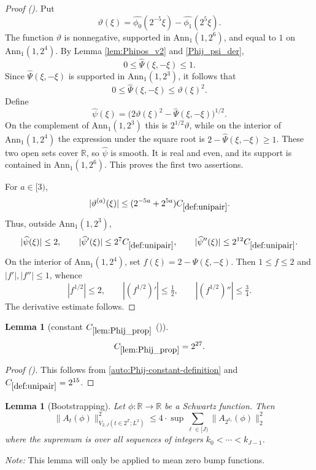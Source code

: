 \documentclass[12pt,reqno]{amsart}
\newcommand{\auto}{{({\tiny\faCar})}}
\theoremstyle{plain}
\newtheorem{lemma}[theorem]{Lemma}
\numberwithin{equation}{section}
\theoremstyle{remark}
\newcommand{\uses}[1]{}
\newcommand{\usesdefs}[1]{}
\newcommand{\Z}{{\mathbb Z}}
\newcommand{\R}{{\mathbb R}}
\begin{document}
\begin{proof}[Proof \auto]
Put
\[
\vartheta(\xi)=\widehat{\phi_0}(2^{-5}\xi)-\widehat{\phi_1}(2^5\xi).
\]
The function $\vartheta$ is nonnegative, supported in $\mathrm{Ann}_1(1,2^6)$, and equal to $1$ on $\mathrm{Ann}_1(1,2^4)$. By Lemma \ref{lem:Phipos_v2} and \eqref{Phij_psi_der},
\[
0\le\widehat\Psi(\xi,-\xi)\le1.
\]
Since $\widehat\Psi(\xi,-\xi)$ is supported in $\mathrm{Ann}_1(1,2^3)$, it follows that
\begin{equation}\label{eqn:lemPhij_proppf}
0\le\widehat\Psi(\xi,-\xi)\le\vartheta(\xi)^2.
\end{equation}
Define
\begin{equation}\label{def_sqrtpsi}
\widehat\psi(\xi)=\bigl(2\vartheta(\xi)^2-\widehat\Psi(\xi,-\xi)\bigr)^{1/2}.
\end{equation}
On the complement of $\mathrm{Ann}_1(1,2^3)$ this is $2^{1/2}\vartheta$, while on the interior of $\mathrm{Ann}_1(1,2^4)$ the expression under the square root is $2-\widehat\Psi(\xi,-\xi)\ge1$. These two open sets cover $\R$, so $\widehat\psi$ is smooth. It is real and even, and its support is contained in $\mathrm{Ann}_1(1,2^6)$. This proves the first two assertions.

For $a\in[3)$,
\[
|\vartheta^{(a)}(\xi)|
\le (2^{-5a}+2^{5a})C_{\ref{def:unipair}}.
\]
Thus, outside $\mathrm{Ann}_1(1,2^3)$,
\[
|\widehat\psi(\xi)|\le2,
\qquad
|\widehat\psi'(\xi)|\le2^7C_{\ref{def:unipair}},
\qquad
|\widehat\psi''(\xi)|\le2^{12}C_{\ref{def:unipair}}.
\]
On the interior of $\mathrm{Ann}_1(1,2^4)$, set $f(\xi)=2-\widehat\Psi(\xi,-\xi)$. Then $1\le f\le2$ and $|f'|,|f''|\le1$, whence
\[
|f^{1/2}|\le2,
\qquad
|(f^{1/2})'|\le\tfrac12,
\qquad
|(f^{1/2})''|\le\tfrac34.
\]
The derivative estimate follows.
\end{proof}

\begin{lemma}[constant $C_{\ref{lem:Phij_prop}}$ \auto]\label{constant Phij proposition}\uses{lem:Phij_prop}\usesdefs{def:unipair}
\begin{equation}\label{constant Phij proposition bound}
C_{\ref{lem:Phij_prop}}=2^{27}.
\end{equation}
\end{lemma}
\begin{proof}[Proof \auto]
This follows from \eqref{auto:Phij-constant-definition} and $C_{\ref{def:unipair}}=2^{15}$.
\end{proof}


\begin{lemma}[Bootstrapping]
\label{lem:bootstrap}\uses{}\usesdefs{A_def}
Let $\phi:\R\to \R$ be a Schwartz function.
Then
    \begin{equation}\label{auto:dyadic-variation-bootstrap}\|A_{t}(\phi)\|^2_{V_{2,J}(t\in 2^{\Z}; L^2)} \le  4 \cdot \sup \sum_{\ell\in [J)} \|A_{2^{k_{\ell}}}(\phi)\|^2_2     \end{equation}
    where the supremum is over all sequences of integers $k_0<\cdots <k_{J-1}$.
\end{lemma}
{\em Note:} This lemma will only be applied to mean zero bump functions.
\end{document}
